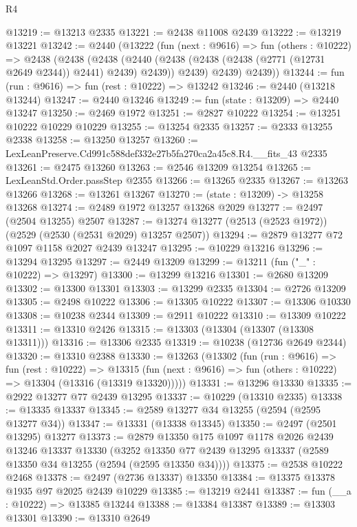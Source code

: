 \begin{lexlean}{R4}
\begin{coremodule}
@13219 := @13213 @2335
@13221 := @2438 @11008 @2439
@13222 := @13219 @13221
@13242 := @2440
    (@13222
      (fun (next : @9616) =>
      fun (others : @10222) =>
      @2438
        (@2438
          (@2438
            (@2440 (@2438 (@2438 (@2438 (@2771 (@12731 @2649 @2344)) @2441) @2439) @2439))
            @2439)
          @2439)
        @2439))
@13244 := fun (run : @9616) => fun (rest : @10222) => @13242
@13246 := @2440 (@13218 @13244)
@13247 := @2440 @13246
@13249 := fun (state : @13209) => @2440 @13247
@13250 := @2469 @1972
@13251 := @2827 @10222
@13254 := @13251 @10222 @10229 @10229
@13255 := @13254 @2335
@13257 := @2333 @13255 @2338
@13258 := @13250 @13257
@13260 := LexLeanPreserve.Cd991c588def332e27b5fa270ca2a45c8.R4.__fits_43 @2335
@13261 := @2475 @13260
@13263 := @2546 @13209 @13254
@13265 := LexLeanStd.Order.passStep @2355
@13266 := @13265 @2335
@13267 := @13263 @13266
@13268 := @13261 @13267
@13270 := (state : @13209) -> @13258 @13268
@13274 := @2489 @1972 @13257 @13268 @2029
@13277 := @2497 (@2504 @13255) @2507
@13287 := @13274 @13277 (@2513 (@2523 @1972)) (@2529 (@2530 (@2531 @2029) @13257 @2507))
@13294 := @2879 @13277 @72 @1097 @1158 @2027 @2439 @13247
@13295 := @10229 @13216
@13296 := @13294 @13295
@13297 := @2449 @13209
@13299 := @13211 (fun ("_" : @10222) => @13297)
@13300 := @13299 @13216
@13301 := @2680 @13209
@13302 := @13300 @13301
@13303 := @13299 @2335
@13304 := @2726 @13209
@13305 := @2498 @10222
@13306 := @13305 @10222
@13307 := @13306 @10330
@13308 := @10238 @2344
@13309 := @2911 @10222
@13310 := @13309 @10222
@13311 := @13310 @2426
@13315 := @13303 (@13304 (@13307 (@13308 @13311)))
@13316 := @13306 @2335
@13319 := @10238 (@12736 @2649 @2344)
@13320 := @13310 @2388
@13330 := @13263
    (@13302
      (fun (run : @9616) =>
      fun (rest : @10222) =>
      @13315 (fun (next : @9616) => fun (others : @10222) => @13304 (@13316 (@13319 @13320)))))
@13331 := @13296 @13330
@13335 := @2922 @13277 @77 @2439 @13295
@13337 := @10229 (@13310 @2335)
@13338 := @13335 @13337
@13345 := @2589 @13277 @34 @13255 (@2594 (@2595 @13277 @34))
@13347 := @13331 (@13338 @13345)
@13350 := @2497 (@2501 @13295) @13277
@13373 := @2879
    @13350
    @175
    @1097
    @1178
    @2026
    @2439
    @13246
    @13337
    @13330
    (@3252 @13350 @77 @2439 @13295 @13337 (@2589 @13350 @34 @13255 (@2594 (@2595 @13350 @34))))
@13375 := @2538 @10222 @2468
@13378 := @2497 (@2736 @13337) @13350
@13384 := @13375 @13378 @1935 @97 @2025 @2439 @10229
@13385 := @13219 @2441
@13387 := fun (__a : @10222) => @13385 @13244
@13388 := @13384 @13387
@13389 := @13303 @13301
@13390 := @13310 @2649

\end{coremodule}
\end{lexlean}
